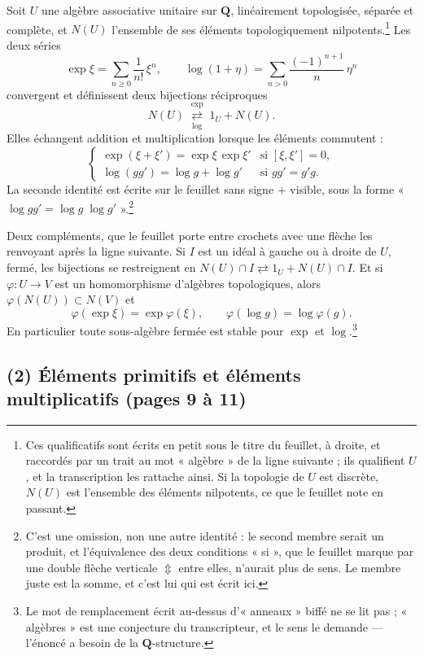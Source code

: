 \documentclass[11pt,a4paper]{article}
\begin{document}
Soit $U$ une algèbre associative unitaire sur $\mathbf{Q}$, linéairement
topologisée, séparée et complète, et $N(U)$ l'ensemble de ses éléments
topologiquement nilpotents.\footnote{Ces qualificatifs sont écrits en petit sous
le titre du feuillet, à droite, et raccordés par un trait au mot
« algèbre » de la ligne suivante ; ils qualifient $U$, et la transcription les
rattache ainsi. Si la topologie de $U$ est discrète, $N(U)$ est l'ensemble des
éléments nilpotents, ce que le feuillet note en passant.} Les deux séries
\[
  \exp \xi = \sum_{n \geqslant 0} \frac{1}{n!}\,\xi^{n} ,
  \qquad
  \log(1+\eta) = \sum_{n > 0} \frac{(-1)^{n+1}}{n}\,\eta^{n}
\]
convergent et définissent deux bijections réciproques
\[
  N(U) \;\underset{\log}{\overset{\exp}{\rightleftarrows}}\; 1_U + N(U) .
\]
Elles échangent addition et multiplication lorsque les éléments commutent :
\[
  \begin{cases}
    \exp(\xi + \xi') = \exp \xi \, \exp \xi' & \text{si } [\xi, \xi'] = 0 , \\[4pt]
    \log(g g') = \log g + \log g' & \text{si } g g' = g' g .
  \end{cases}
\]
La seconde identité est écrite sur le feuillet sans signe $+$ visible, sous la
forme « $\log g g' = \log g \; \log g'$ ».\footnote{C'est une omission, non une
autre identité : le second membre serait un produit, et l'équivalence des deux
conditions « si », que le feuillet marque par une double flèche verticale
$\Updownarrow$ entre elles, n'aurait plus de sens. Le membre juste est la somme,
et c'est lui qui est écrit ici.}

Deux compléments, que le feuillet porte entre crochets avec une flèche les
renvoyant après la ligne suivante. Si $I$ est un idéal à gauche ou à droite de
$U$, fermé, les bijections se restreignent en $N(U) \cap I \rightleftarrows 1_U
+ N(U) \cap I$. Et si $\varphi : U \to V$ est un homomorphisme d'algèbres
topologiques, alors $\varphi(N(U)) \subset N(V)$ et
\[
  \varphi(\exp \xi) = \exp \varphi(\xi) , \qquad
  \varphi(\log g) = \log \varphi(g) .
\]
En particulier toute sous-algèbre fermée est stable pour $\exp$ et
$\log$.\footnote{Le mot de remplacement écrit au-dessus d'« anneaux » biffé ne
se lit pas ; « algèbres » est une conjecture du transcripteur, et le sens le
demande — l'énoncé a besoin de la $\mathbf{Q}$-structure.}

\subsection*{(2) Éléments primitifs et éléments multiplicatifs (pages 9 à 11)}
\end{document}
